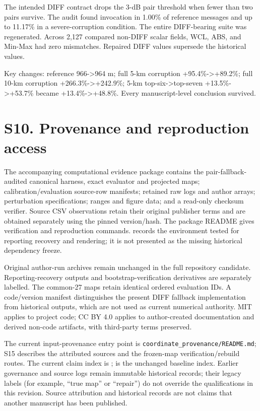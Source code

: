 \documentclass[journal,onecolumn,10pt]{IEEEtran}
\begin{document}
The intended DIFF contract drops the 3-dB pair threshold when fewer than two pairs survive. The audit found invocation in 1.00\% of reference messages and up to 11.17\% in a severe-corruption condition. The entire DIFF-bearing suite was regenerated. Across 2,127 compared non-DIFF scalar fields, WCL, ABS, and Min-Max had zero mismatches. Repaired DIFF values supersede the historical values.

Key changes: reference 966-\textgreater964 m; full 5-km corruption +95.4\%-\textgreater+89.2\%; full 10-km corruption +266.3\%-\textgreater+242.9\%; 5-km top-six-\textgreater top-seven +13.5\%-\textgreater+53.7\% became +13.4\%-\textgreater+48.8\%. Every manuscript-level conclusion survived.

\section*{S10. Provenance and reproduction access}\label{s10.-provenance-and-reproducibility}
The accompanying computational evidence package contains the pair-fallback-audited canonical harness, exact evaluator and projected maps; calibration/evaluation source-row manifests; retained raw logs and author arrays; perturbation specifications; ranges and figure data; and a read-only checksum verifier. Source CSV observations retain their original publisher terms and are obtained separately using the pinned version/hash. The package README gives verification and reproduction commands.  records the environment tested for reporting recovery and rendering; it is not presented as the missing historical dependency freeze.

Original author-run archives remain unchanged in the full repository candidate. Reporting-recovery outputs and bootstrap-verification derivatives are separately labelled. The common-27 maps retain identical ordered evaluation IDs. A code/version manifest distinguishes the present DIFF fallback implementation from historical outputs, which are not used as current numerical authority. MIT applies to project code; CC BY 4.0 applies to author-created documentation and derived non-code artifacts, with third-party terms preserved.

\noindent The current input-provenance entry point is \texttt{coordinate\_provenance/README.md}; S15 describes the attributed sources and the frozen-map verification/rebuild routes. The current claim index is ;  is the unchanged baseline index. Earlier governance and source logs remain immutable historical records; their legacy labels (for example, ``true map'' or ``repair'') do not override the qualifications in this revision. Source attribution and historical records are not claims that another manuscript has been published.
\end{document}
